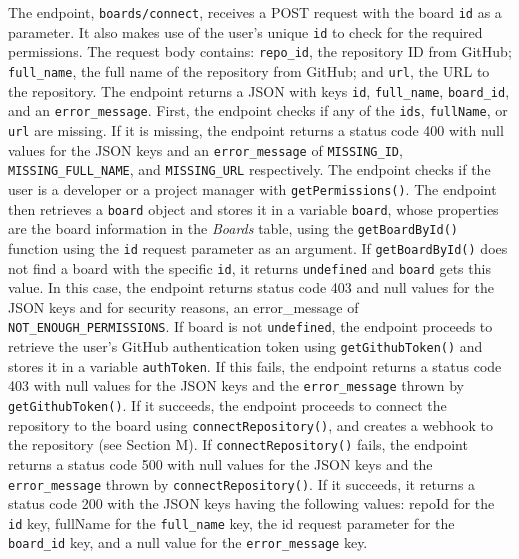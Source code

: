 \documentclass{article}
\def\code#1{\texttt{#1}}
\begin{document}
The endpoint, \code{boards/connect}, receives a POST request with the board
\code{id} as a parameter. It also makes use of the user’s unique \code{id} to
check for the required permissions. The request body contains: \code{repo\_id},
the repository ID from GitHub; \code{full\_name}, the full name of the
repository from GitHub; and \code{url}, the URL to the repository. The endpoint
returns a JSON with keys \code{id}, \code{full\_name}, \code{board\_id}, and an
\code{error\_message}. First, the endpoint checks if any of the \code{ids},
\code{fullName}, or \code{url} are missing. If it is missing, the endpoint
returns a status code 400 with null values for the JSON keys and an
\code{error\_message} of \code{MISSING\_ID}, \code{MISSING\_FULL\_NAME}, and
\code{MISSING\_URL} respectively. The endpoint checks if the user is a developer
or a project manager with \code{getPermissions()}. The endpoint then retrieves a
\code{board} object and stores it in a variable \code{board}, whose properties
are the board information in the \emph{Boards} table, using the
\code{getBoardById()} function using the \code{id} request parameter as an
argument. If \code{getBoardById()} does not find a board with the specific
\code{id}, it returns \code{undefined} and \code{board} gets this value. In this
case, the endpoint returns status code 403 and null values for the JSON keys and
for security reasons, an error\_message of \code{NOT\_ENOUGH\_PERMISSIONS}. If
board is not \code{undefined}, the endpoint proceeds to retrieve the user’s
GitHub authentication token using \code{getGithubToken()} and stores it in a
variable \code{authToken}. If this fails, the endpoint returns a status code 403
with null values for the JSON keys and the \code{error\_message} thrown by
\code{getGithubToken()}. If it succeeds, the endpoint proceeds to connect the
repository to the board using \code{connectRepository()}, and creates a webhook
to the repository (see Section M). If \code{connectRepository()} fails, the
endpoint returns a status code 500 with null values for the JSON keys and the
\code{error\_message} thrown by \code{connectRepository()}. If it succeeds, it
returns a status code 200 with the JSON keys having the following values: repoId
for the \code{id} key, fullName for the \code{full\_name} key, the id request
parameter for the \code{board\_id} key, and a null value for the
\code{error\_message} key.
\end{document}
